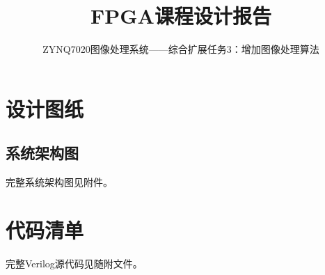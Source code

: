 \documentclass[12pt, a4paper]{ctexart}
\title{FPGA课程设计报告}
\subtitle{ZYNQ7020图像处理系统——综合扩展任务3：增加图像处理算法}
\begin{document}
\makecover

\tableofcontents
\clearpage

\setcounter{page}{1}










\appendix
\section{\centering 设计图纸}
\subsection*{系统架构图}
完整系统架构图见附件。

\section{\centering 代码清单}
完整Verilog源代码见随附文件。
\end{document}
